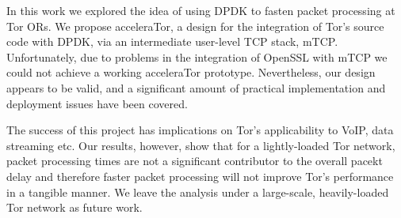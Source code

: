 \documentclass[conference]{IEEEtran}
\begin{document}
In this work we explored the idea of using DPDK to fasten packet processing at Tor ORs. We propose acceleraTor, a design for the integration of Tor's source code with DPDK, via an intermediate user-level TCP stack, mTCP. Unfortunately, due to problems in the integration of OpenSSL with mTCP we could not achieve a working acceleraTor prototype. Nevertheless, our design appears to be valid, and a significant amount of practical implementation and deployment issues have been covered.

The success of this project has implications on Tor's applicability to VoIP, data streaming etc. Our results, however, show that for a lightly-loaded Tor network, packet processing times are not a significant contributor to the overall pacekt delay and therefore faster packet processing will not improve Tor's performance in a tangible manner. We leave the analysis under a large-scale, heavily-loaded Tor network as future work.

% 
% 
% 
% 
% 




\end{document}

